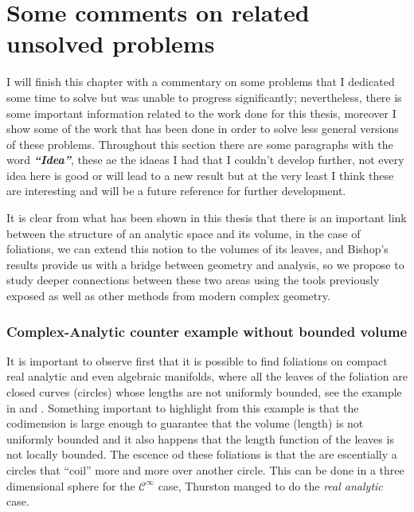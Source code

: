 \documentclass[12pt,twoside,a4paper]{report}
\newcommand{\csheaf}{\ensuremath{\mathcal C }}
\begin{document}

\section{Some comments on related unsolved problems}
\noindent I will finish this chapter with a commentary on some problems that I dedicated some time to solve but was unable to progress significantly; nevertheless, there is some important information related to the work done for this thesis, moreover I show some of the work that has been done in order to solve less general versions of these problems. Throughout this section there are some paragraphs with the word \emph{\bf``Idea''}, these ae the idaeas I had that I couldn't develop further, not every idea here is good or will lead to a new result but at the very least I think these are interesting and will be a future reference for further development.  

It is clear from what has been shown in this thesis that there is an important link between the structure of an analytic space and its volume, in the case of foliations, we can extend this notion to the volumes of its leaves, and Bishop's results provide us with a bridge between geometry and analysis, so we propose to study deeper connections between these two areas using the tools previously exposed as well as other methods from modern complex geometry.

\subsubsection*{Complex-Analytic counter example without bounded volume}
\noindent It is important to observe first that it is possible to find foliations on compact real analytic and even algebraic manifolds, where all the leaves of the foliation are closed curves (circles) whose lengths are not uniformly bounded, see the example in \cite{E-V} and \cite{Epstein2}. Something important to highlight from this example is that the codimension is large enough to guarantee that the volume (length) is not uniformly bounded and it also happens that the length function of the leaves is not locally bounded. The escence od these foliations is that the are escentially a circles that ``coil'' more and more over another circle. This can be done in a three dimensional sphere for the $\csheaf^{\infty}$ case, Thurston manged to do the \emph{real analytic} case.   
\end{document}
